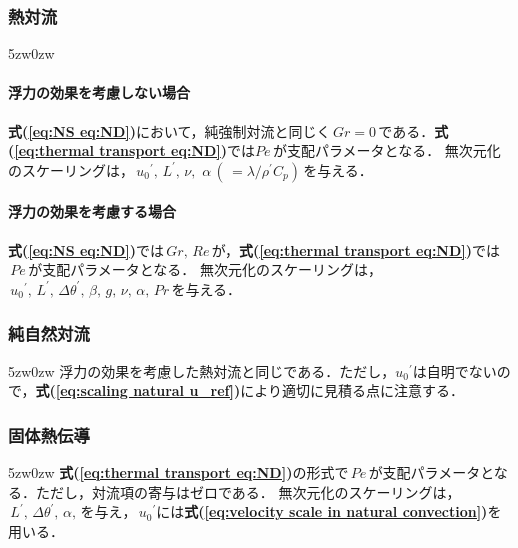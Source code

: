 \subsubsection{熱対流}
\begin{indentation}{5zw}{0zw}
\paragraph{浮力の効果を考慮しない場合}
\noindent \textbf{式(\ref{eq:NS eq:ND})}において，純強制対流と同じく$\,Gr=0\,$である．\textbf{式(\ref{eq:thermal transport eq:ND})}では$Pe\,$が支配パラメータとなる．
無次元化のスケーリングは，$\,{u_{0}}^{\prime},\,L^{\prime},\,\nu,\,\,\alpha\,(\,=\lambda / \rho^{\prime} C_{p})\,$を与える．\\
\paragraph{浮力の効果を考慮する場合}
\textbf{式(\ref{eq:NS eq:ND})}では$\,Gr,\,Re\,$が，\textbf{式(\ref{eq:thermal transport eq:ND})}では$\,Pe\,$が支配パラメータとなる．
無次元化のスケーリングは，$\,{u_{0}}^{\prime},\,L^{\prime},\,\Delta\theta^{\prime},\,\beta,\,g,\,\nu,\,\alpha,\,Pr\,$を与える．\\
\end{indentation}

\subsubsection{純自然対流}
\begin{indentation}{5zw}{0zw}
\noindent 浮力の効果を考慮した熱対流と同じである．ただし，${u_{0}}^{\prime}$は自明でないので，\textbf{式(\ref{eq:scaling natural u_ref})}により適切に見積る点に注意する．\\
\end{indentation}

\subsubsection{固体熱伝導}
\begin{indentation}{5zw}{0zw}
\noindent \textbf{式(\ref{eq:thermal transport eq:ND})}の形式で$\,Pe\,$が支配パラメータとなる．ただし，対流項の寄与はゼロである．
無次元化のスケーリングは，$\,L^{\prime},\,\Delta \theta^{\prime},\,\alpha,\,$を与え，$\,{u_{0}}^{\prime}$には\textbf{式(\ref{eq:velocity scale in natural convection})}を用いる．\\
\end{indentation}

